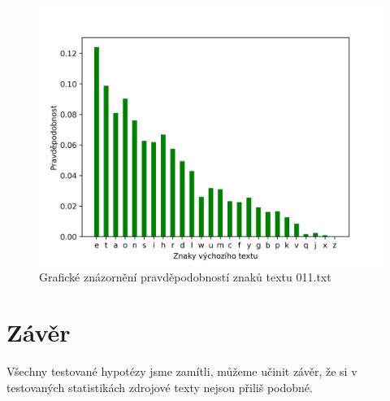 \documentclass[12pt]{article}
\begin{document}
\begin{figure}[!ht]
\includegraphics[scale=0.8]{011_char_prob.png}\centering\caption{Grafické znázornění pravděpodobností znaků textu 011.txt}\label{011_graph2}
\end{figure}



   	\section{Závěr}\label{z}
    Všechny testované hypotézy jsme zamítli, můžeme učinit závěr, že si v testovaných statistikách zdrojové texty nejsou
    přiliš podobné.
\end{document}

